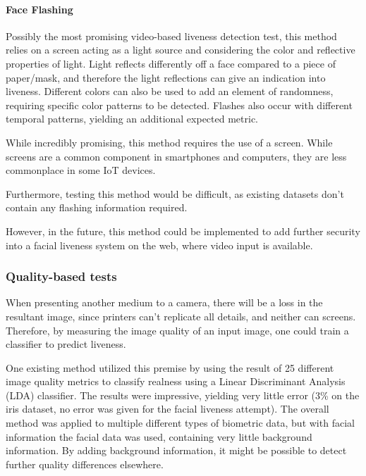\documentclass[10pt,a4paper]{article}
\begin{document}
        \paragraph{Face Flashing}
        Possibly the most promising video-based liveness detection test, this method relies on a screen acting as a light source and considering the color and reflective properties of light. Light reflects differently off a face compared to a piece of paper/mask, and therefore the light reflections can give an indication into liveness. Different colors can also be used to add an element of randomness, requiring specific color patterns to be detected. Flashes also occur with different temporal patterns, yielding an additional expected metric.

        While incredibly promising, this method requires the use of a screen. While screens are a common component in smartphones and computers, they are less commonplace in some IoT devices. 

        Furthermore, testing this method would be difficult, as existing datasets don't contain any flashing information required. 

        However, in the future, this method could be implemented to add further security into a facial liveness system on the web, where video input is available.
        
        \subsubsection{Quality-based tests}
        When presenting another medium to a camera, there will be a loss in the resultant image, since printers can't replicate all details, and neither can screens. Therefore, by measuring the image quality of an input image, one could train a classifier to predict liveness.

        One existing method utilized this premise by using the result of 25 different image quality metrics to classify realness using a Linear Discriminant Analysis (LDA) classifier. The results were impressive, 
        yielding very little error (3\% on the iris dataset, no error was given for the facial liveness attempt). The overall method was applied to multiple different types of biometric data, but with facial information the facial data was used, containing very little background information. \cite{ImageQualityAssessmentTest}
        By adding background information, it might be possible to detect further quality differences elsewhere. 
        
\end{document}
